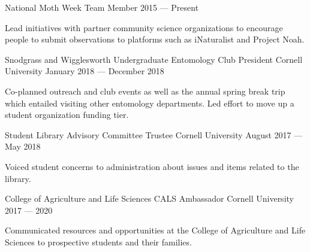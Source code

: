 

\begin{cventries}

  \cventry
    {National Moth Week} %
    {Team Member} %
    {} %
    {2015 — Present} %
    {
      \begin{cvitems} %
        \item {Lead initiatives with partner community science organizations to encourage people to submit observations to platforms such as iNaturalist and Project Noah.}
      \end{cvitems}
    }

  \cventry
    {Snodgrass and Wigglesworth Undergraduate Entomology Club} %
    {President} %
    {Cornell University} %
    {January 2018 — December 2018} %
    {
      \begin{cvitems} %
        \item {Co-planned outreach and club events as well as the annual spring break trip which entailed visiting other entomology departments. Led effort to move up a student organization funding tier.}
      \end{cvitems}
    }

  \cventry
    {Student Library Advisory Committee} %
    {Trustee} %
    {Cornell University} %
    {August 2017 — May 2018} %
    {
      \begin{cvitems} %
        \item {Voiced student concerns to administration about issues and items related to the library.}
      \end{cvitems}
    }

  \cventry
    {College of Agriculture and Life Sciences} %
    {CALS Ambassador} %
    {Cornell University} %
    {2017 — 2020} %
    {
      \begin{cvitems} %
        \item {Communicated resources and opportunities at the College of Agriculture and Life Sciences to prospective students and their families.}
      \end{cvitems}
    }


\end{cventries}
